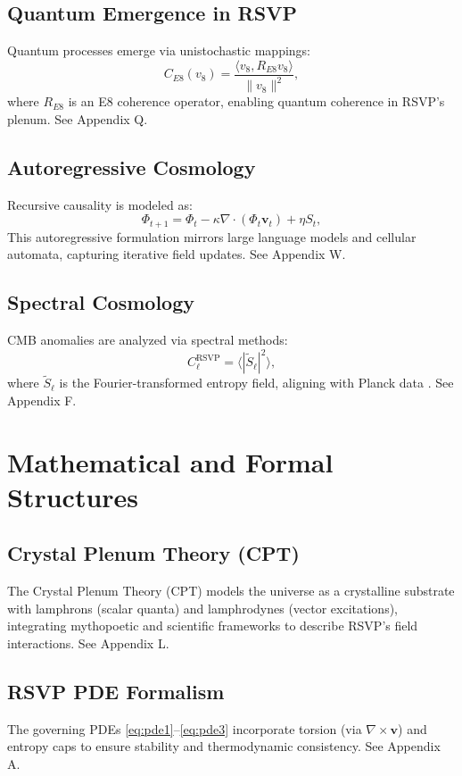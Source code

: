 \documentclass[12pt]{report}
\newcommand{\PhiRSVP}{\Phi}
\newcommand{\vRSVP}{\mathbf{v}}
\newcommand{\SRSVP}{S}
\begin{document}
\chapter{Quantum Emergence in RSVP}
Quantum processes emerge via unistochastic mappings:
\begin{equation}
C_{E8}(v_8) = \frac{\langle v_8, R_{E8} v_8 \rangle}{\|v_8\|^2}, \label{eq:e8}
\end{equation}
where \(R_{E8}\) is an E8 coherence operator, enabling quantum coherence in RSVP’s plenum. See Appendix Q.

\chapter{Autoregressive Cosmology}
Recursive causality is modeled as:
\begin{equation}
\PhiRSVP_{t+1} = \PhiRSVP_t - \kappa \nabla \cdot (\PhiRSVP_t \vRSVP_t) + \eta \SRSVP_t, \label{eq:autoregressive}
\end{equation}
This autoregressive formulation mirrors large language models and cellular automata, capturing iterative field updates. See Appendix W.

\chapter{Spectral Cosmology}
CMB anomalies are analyzed via spectral methods:
\begin{equation}
C_\ell^{\text{RSVP}} = \langle |\tilde{\SRSVP}_\ell|^2 \rangle, \label{eq:cmb}
\end{equation}
where \(\tilde{\SRSVP}_\ell\) is the Fourier-transformed entropy field, aligning with Planck data \citep{Planck2020}. See Appendix F.

\part{Mathematical and Formal Structures}

\chapter{Crystal Plenum Theory (CPT)}
The Crystal Plenum Theory (CPT) models the universe as a crystalline substrate with lamphrons (scalar quanta) and lamphrodynes (vector excitations), integrating mythopoetic and scientific frameworks to describe RSVP’s field interactions. See Appendix L.

\chapter{RSVP PDE Formalism}
The governing PDEs \eqref{eq:pde1}--\eqref{eq:pde3} incorporate torsion (via \(\nabla \times \vRSVP\)) and entropy caps to ensure stability and thermodynamic consistency. See Appendix A.
\end{document}

